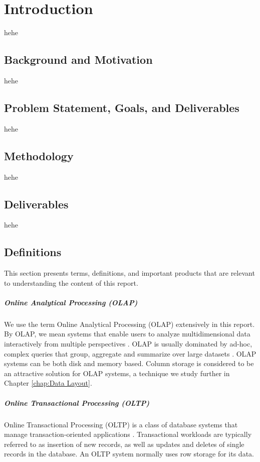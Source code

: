 \chapter{Introduction}
\label{chap:introduction}
hehe

\section{Background and Motivation}
\label{sec:Background and Motivation}
hehe

\section{Problem Statement, Goals, and Deliverables}
\label{sec:Problem Statement, Goals, and Deliverables}
hehe

\section{Methodology}
\label{sec:Methodology}
hehe

\section{Deliverables}
\label{sec:Deliverables}
hehe

\section{Definitions}
\label{sec:Definitions}
This section presents terms, definitions, and important products that are relevant to understanding the content of this report.

\paragraph{Online Analytical Processing (OLAP)}
\label{par:Online Analytical Processing (OLAP)}
  We use the term Online Analytical Processing (OLAP) extensively in this report. By OLAP, we mean systems that enable users to analyze multidimensional data interactively from multiple perspectives \cite{Wikipedia_contributors2015-hw}. OLAP is usually dominated by ad-hoc, complex queries that group, aggregate and summarize over large datasets \cite{Bjorklund2011-wh}. OLAP systems can be both disk and memory based. Column storage is considered to be an attractive solution for OLAP systems, a technique we study further in Chapter \ref{chap:Data Layout}.


\paragraph{Online Transactional Processing (OLTP)}
\label{par:Online Transactional Processing (OLTP)}
Online Transactional Processing (OLTP) is a class of database systems that manage transaction-oriented applications \cite{Wikipedia_contributors2015-cw}. Transactional workloads are typically referred to as insertion of new records, as well as updates and deletes of single records in the database. An OLTP system normally uses row storage for its data.

